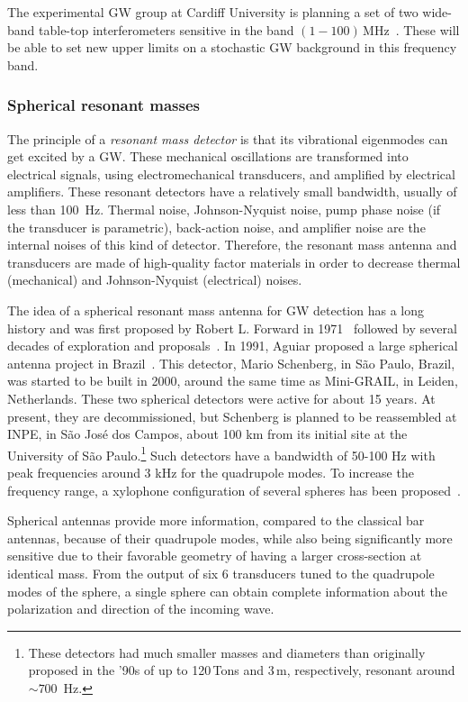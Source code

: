 \documentclass[11pt,a4paper]{article}
\begin{document}
The experimental GW group at Cardiff University is planning a set of two wide-band table-top interferometers sensitive in the band $(1-100)\,$MHz~\cite{vermeulen2020experiment}.
These will be able to set new upper limits on a stochastic GW background in this frequency band.

\subsubsection{Spherical resonant masses}
\label{sec:spheres}

The principle of a \textit{resonant mass detector} is that its vibrational eigenmodes can get excited by a GW. These mechanical oscillations are transformed into electrical signals, using electromechanical transducers, and amplified by electrical amplifiers. These resonant detectors have a relatively small bandwidth, usually of less than 100~Hz. Thermal noise, Johnson-Nyquist noise, pump phase noise (if the transducer is parametric), back-action noise, and amplifier noise are the internal noises of this kind of detector. Therefore, the resonant mass antenna and transducers are made of high-quality factor
materials in order to decrease thermal (mechanical) and Johnson-Nyquist (electrical) noises.

The idea of a spherical resonant mass antenna for GW detection has a long history and was first proposed by Robert L. Forward in 1971~\cite{Forward1971} followed by several decades of exploration and proposals~\cite{wagoner1977multimode, hamilton1990resonant, PhysRevLett.70.2367}.
In 1991, Aguiar  proposed a large spherical antenna project in Brazil~\cite{Aguiar:2010kn}. This detector, Mario Schenberg, in S\~ao Paulo, Brazil\cite{Da_Silva_Costa_2014}, was started to be built in 2000, around the same time as Mini-GRAIL, in Leiden, Netherlands. These two spherical detectors were active for about 15 years. At present, they are decommissioned, but Schenberg is planned to be reassembled at INPE, in S\~ao Jos\'e dos Campos, about 100 km from its initial site at the University of S\~ao Paulo.\footnote{These detectors had much smaller masses and diameters than originally proposed in the ’90s of up to 120\,Tons and 3\,m, respectively, resonant around $\sim 700\,$ Hz.} Such detectors have a bandwidth of 50-100 Hz with peak frequencies around 3 kHz for the quadrupole modes. To increase the frequency range, a xylophone configuration of several spheres has been proposed~\cite{PhysRevD.54.2409}.

Spherical antennas provide more information, compared to the classical bar antennas, because of their quadrupole modes, while also being significantly more sensitive due to their favorable geometry of having a larger cross-section at identical mass. From the output of six 6 transducers tuned to the quadrupole modes of the sphere, a single sphere can obtain complete information about the polarization and direction of the incoming wave.
\end{document}
